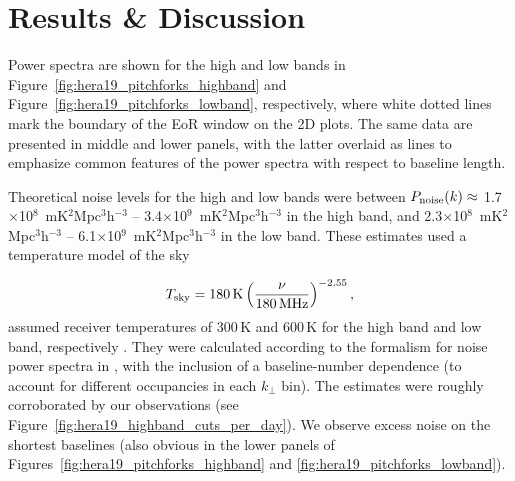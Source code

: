 \section{Results \& Discussion}
\label{sec:hera19_results}


Power spectra are shown for the high and low bands in Figure~\ref{fig:hera19_pitchforks_highband} and Figure~\ref{fig:hera19_pitchforks_lowband}, respectively, where white dotted lines mark the boundary of the EoR window on the 2D plots.  The same data are presented in middle and lower panels, with the latter overlaid as lines to emphasize common features of the power spectra with respect to baseline length. 

Theoretical noise levels for the high and low bands were between 
$P_{\rm noise}(k)\approx$ 1.7$\times$10$^8$ \,mK$^2$Mpc$^3$h$^{-3}$ -- 3.4$\times$10$^9$ \,mK$^2$Mpc$^3$h$^{-3}$ in the high band, and 2.3$\times$10$^8$ \,mK$^2$Mpc$^3$h$^{-3}$ -- 6.1$\times$10$^9$ \,mK$^2$Mpc$^3$h$^{-3}$ in the low band. These estimates used a temperature model of the sky

\begin{equation}
T_{\rm sky} = 180\,{\rm K} \left(\frac{\nu}{180\,{\rm MHz}}\right)^{-2.55},
\end{equation}
assumed receiver temperatures of 300\,K and 600\,K for the high band and low band, respectively \citep[][also see the public HERA Memo \# 16]{deBoer.17}. They were calculated according to the formalism for noise power spectra in \cite{Parsons.12a}, with the inclusion of a baseline-number dependence (to account for different occupancies in each $k_{\perp}$ bin).
The estimates were roughly corroborated by our observations (see Figure~\ref{fig:hera19_highband_cuts_per_day}). We observe excess noise on the shortest baselines (also obvious in the lower panels of Figures~\ref{fig:hera19_pitchforks_highband} and \ref{fig:hera19_pitchforks_lowband}). 

